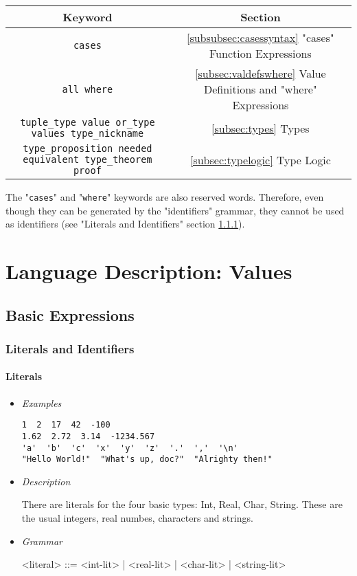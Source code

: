 \documentclass{article}
\begin{document}
\begin{center}
\begin{tabular}{ |c|c| } 
\hline
Keyword & Section
\\ 
\hline
\hline
\texttt{cases} & \ref{subsubsec:casessyntax} "cases" Function Expressions
\\
\hline
\texttt{all where} & \ref{subsec:valdefswhere}
Value Definitions and "where" Expressions
\\
\hline
\texttt{tuple_type value or_type values type_nickname} &
\ref{subsec:types} Types
\\
\hline
\texttt{type_proposition needed equivalent type_theorem proof} &
{\ref{subsec:typelogic} Type Logic}
\\
\hline
\end{tabular}
\end{center}
The "\texttt{cases}" and "\texttt{where}" keywords are also
reserved words. Therefore, even though they can be generated by the
"identifiers" grammar, they cannot be used as identifiers (see "Literals and
Identifiers" section \ref{subsubsec:litsandidents}).

\newpage
\section{Language Description: Values}

\subsection{Basic Expressions}

\subsubsection{Literals and Identifiers}
\label{subsubsec:litsandidents}

\paragraph{Literals}
\begin{itemize}

\item \textit{Examples}
\begin{verbatim}
1  2  17  42  -100
1.62  2.72  3.14  -1234.567
'a'  'b'  'c'  'x'  'y'  'z'  '.'  ','  '\n'
"Hello World!"  "What's up, doc?"  "Alrighty then!"
\end{verbatim}

\item \textit{Description}

There are literals for the four basic types: Int, Real, Char, String. These are
the usual integers, real numbes, characters and strings.

\item \textit{Grammar}
\begin{grammar}
<literal> ::= <int-lit> | <real-lit> | <char-lit> | <string-lit>
\end{grammar}

\end{itemize}
\end{document}
